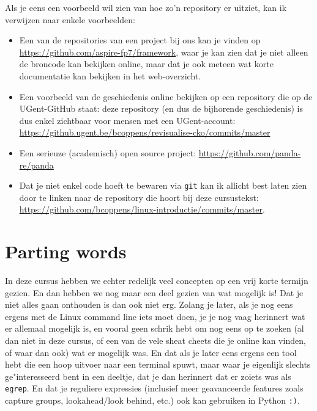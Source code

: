 \documentclass[a4paper,twoside,openany]{memoir}
\begin{document}
Als je eens een voorbeeld wil zien van hoe zo'n repository er uitziet, kan ik
verwijzen naar enkele voorbeelden:
\begin{itemize}
\item Een van de repositories van een project bij ons kan je vinden op
  \url{https://github.com/aspire-fp7/framework}, waar je kan zien dat je niet
    alleen de broncode kan bekijken online, maar dat je ook meteen wat korte
    documentatie kan bekijken in het web-overzicht.
\item Een voorbeeld van de geschiedenis online bekijken op een repository die
  op de UGent-GitHub staat: deze repository (en dus de bijhorende geschiedenis)
    is dus enkel zichtbaar voor mensen met een UGent-account:
    \url{https://github.ugent.be/bcoppens/revisualise-cko/commits/master}
\item Een serieuze (academisch) open source project:
  \url{https://github.com/panda-re/panda}
\item Dat je niet enkel code hoeft te bewaren via \verb!git! kan ik allicht
  best laten zien door te linken naar de repository die hoort bij deze
    cursustekst:
    \url{https://github.com/bcoppens/linux-introductie/commits/master}.
\end{itemize}

\chapter{Parting words}

In deze cursus hebben we echter redelijk veel concepten op een vrij korte
termijn gezien. En dan hebben we nog maar een deel gezien van wat mogelijk
is! Dat je niet alles gaan onthouden is dan ook niet erg. Zolang je
later, als je nog eens ergens met de Linux command line iets moet doen, je je
nog vaag herinnert wat er allemaal mogelijk is, en vooral geen schrik hebt om
nog eens op te zoeken (al dan niet in deze cursus, of een van de vele sheat
cheets die je online kan vinden, of waar dan ook) wat er mogelijk was. En dat
als je later eens ergens een tool hebt die een hoop uitvoer naar een terminal
spuwt, maar waar je eigenlijk slechts ge"interesseerd bent in een deeltje, dat
je dan herinnert dat er zoiets was als \verb!egrep!. En dat je reguliere
expressies (inclusief meer geavanceerde features zoals capture groups,
lookahead/look behind, etc.) ook kan gebruiken in Python \verb!:)!.
\end{document}
